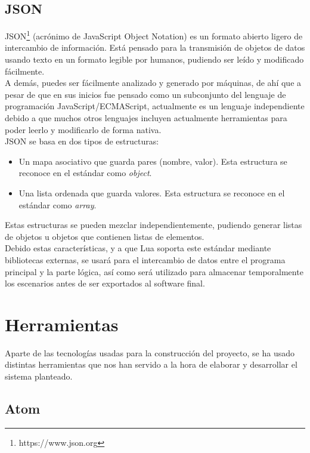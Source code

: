 \subsection{JSON}

JSON\footnote{https://www.json.org} (acrónimo de JavaScript Object Notation) es un formato abierto \cite{JSON} ligero de intercambio de información. Está pensado para la transmisión de objetos de datos usando texto en un formato legible por humanos, pudiendo ser leído y modificado fácilmente. \\

A demás, puedes ser fácilmente analizado y generado por máquinas, de ahí que a pesar de que en sus inicios fue pensado como un subconjunto del lenguaje de programación JavaScript/ECMAScript, actualmente es un lenguaje independiente debido a que muchos otros lenguajes incluyen actualmente herramientas para poder leerlo y modificarlo de forma nativa. \\

JSON se basa en dos tipos de estructuras:

\begin{itemize}
	\item Un mapa asociativo que guarda pares (nombre, valor). Esta estructura se reconoce en el estándar como \textit{object}.
	\item Una lista ordenada que guarda valores. Esta estructura se reconoce en el estándar como \textit{array}.
\end{itemize}

Estas estructuras se pueden mezclar independientemente, pudiendo generar listas de objetos u objetos que contienen listas de elementos. \\

Debido estas características, y a que Lua soporta este estándar mediante bibliotecas externas, se usará para el intercambio de datos entre el programa principal y la parte lógica, así como será utilizado para almacenar temporalmente los escenarios antes de ser exportados al software final.

\section{Herramientas}

Aparte de las tecnologías usadas para la construcción del proyecto, se ha usado distintas herramientas que nos han servido a la hora de elaborar y desarrollar el sistema planteado.

\subsection{Atom}

